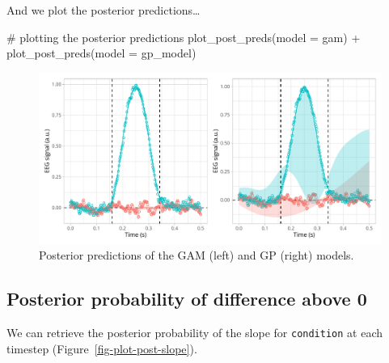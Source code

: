 \documentclass[
  doc,
  floatsintext,
  longtable,
  a4paper,
  nolmodern,
  notxfonts,
  notimes,
  colorlinks=true,linkcolor=blue,citecolor=blue,urlcolor=blue]{apa7}
\newenvironment{Shaded}{\begin{snugshade}}{\end{snugshade}}
\newcommand{\AttributeTok}[1]{\textcolor[rgb]{0.40,0.45,0.13}{#1}}
\newcommand{\CommentTok}[1]{\textcolor[rgb]{0.37,0.37,0.37}{#1}}
\newcommand{\FunctionTok}[1]{\textcolor[rgb]{0.28,0.35,0.67}{#1}}
\newcommand{\NormalTok}[1]{\textcolor[rgb]{0.00,0.23,0.31}{#1}}
\newcommand{\SpecialCharTok}[1]{\textcolor[rgb]{0.37,0.37,0.37}{#1}}
\begin{document}
And we plot the posterior predictions\ldots{}

\begin{Shaded}
\begin{Highlighting}[]
\CommentTok{\# plotting the posterior predictions}
\FunctionTok{plot\_post\_preds}\NormalTok{(}\AttributeTok{model =}\NormalTok{ gam) }\SpecialCharTok{+} \FunctionTok{plot\_post\_preds}\NormalTok{(}\AttributeTok{model =}\NormalTok{ gp\_model)}
\end{Highlighting}
\end{Shaded}

\begin{figure}[H]

\caption{Posterior predictions of the GAM (left) and GP (right) models.}

{\centering \includegraphics[width=1\textwidth,height=\textheight]{brms_meeg_files/figure-pdf/gam-gp-preds-1.pdf}

}

\end{figure}%

\subsection{Posterior probability of difference above
0}\label{posterior-probability-of-difference-above-0}

We can retrieve the posterior probability of the slope for
\texttt{condition} at each timestep (Figure~\ref{fig-plot-post-slope}).
\end{document}
